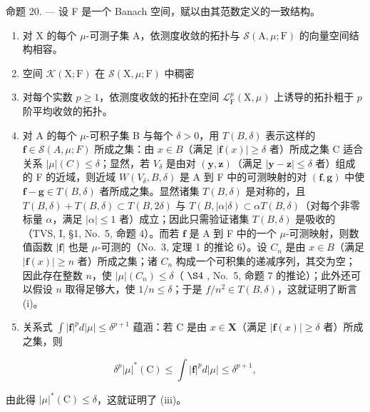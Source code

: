命题 20. --- 设 F 是一个 Banach 空间，赋以由其范数定义的一致结构。

\begin{enumerate}
\def\labelenumi{(\roman{enumi})}
\item
  对 X 的每个 \(\mu\)-可测子集 A，依测度收敛的拓扑与 \(\mathcal{S}(\mathrm{A},\mu;\mathrm{F})\) 的向量空间结构相容。
\item
  空间 \(\mathcal{K}(\mathrm{X};\mathrm{F})\) 在 \(\mathcal{S}(\mathrm{X},\mu ;\mathrm{F})\) 中稠密
\item
  对每个实数 \(p \geqslant 1\)，依测度收敛的拓扑在空间 \(\mathcal{L}_{\mathrm{F}}^{p}(\mathrm{X},\mu)\) 上诱导的拓扑粗于 \(p\) 阶平均收敛的拓扑。
\setcounter{enumi}{0}
\item
  对 A 的每个 \(\mu\)-可积子集 B 与每个 \(\delta > 0\)，用 \(T(B, \delta)\) 表示这样的 \(\mathbf{f} \in \mathcal{S}(A, \mu; F)\) 所成之集：由 \(x \in B\)（满足 \(|\mathbf{f}(x)| \geqslant \delta\) 者）所成之集 C 适合关系 \(|\mu|(C) \leqslant \delta\)；显然，若 \(V_{\delta}\) 是由对 \((\mathbf{y}, \mathbf{z})\)（满足 \(|\mathbf{y} - \mathbf{z}| \leqslant \delta\) 者）组成的 F 的近域，则近域 \(W(V_{\delta}, B, \delta)\) 是 A 到 F 中的可测映射的对 \((\mathbf{f}, \mathbf{g})\) 中使 \(\mathbf{f} - \mathbf{g} \in T(B, \delta)\) 者所成之集。显然诸集 \(T(B, \delta)\) 是对称的，且 \(T(B, \delta) + T(B, \delta) \subset T(B, 2\delta)\) 与 \(T(B, |\alpha| \delta) \subset \alpha T(B, \delta)\)（对每个非零标量 \(\alpha\)，满足 \(|\alpha| \leqslant 1\) 者）成立；因此只需验证诸集 \(T(B, \delta)\) 是吸收的（TVS, I, §1, No.~5, 命题 4）。而若 \(\mathbf{f}\) 是 A 到 F 中的一个 \(\mu\)-可测映射，则数值函数 \(|\mathbf{f}|\) 也是 \(\mu\)-可测的（No.~3, 定理 1 的推论 6）。设 \(C_n\) 是由 \(x \in B\)（满足 \(|\mathbf{f}(x)| \geqslant n\) 者）所成之集；诸 \(C_n\) 构成一个可积集的递减序列，其交为空；因此存在整数 \(n\)，使 \(|\mu|(C_n) \leqslant \delta\)（ \(\S 4\) , No.~5, 命题 7 的推论）；此外还可以假设 \(n\) 取得足够大，使 \(1/n \leqslant \delta\)；于是 \(f/n^2 \in T(B, \delta)\)，这就证明了断言 (i)。
\setcounter{enumi}{2}
\item
  关系式 \(\int |\mathbf{f}|^p d|\mu| \leqslant \delta^{p+1}\) 蕴涵：若 C 是由 \(x \in \mathbf{X}\)（满足 \(|\mathbf{f}(x)| \geqslant \delta\) 者）所成之集，则
\end{enumerate}

\[
\delta^ {p} | \mu | ^ {*} (\mathrm{C}) \leqslant \int | \mathbf {f} | ^ {p} d | \mu | \leqslant \delta^ {p + 1},
\]

由此得 \(|\mu|^*(\mathrm{C}) \leqslant \delta\)，这就证明了 (iii)。

